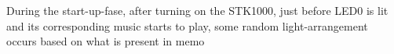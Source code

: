 \documentclass[a4paper,12pt]{article}
\begin{document}
During the start-up-fase, after turning on the STK1000, just before LED0 is lit and its corresponding music starts to play, some random light-arrangement occurs based on what is present in memo                                                                                                                                                                                                                                                                                                                                                                                                                                                                                                                                                                                                                                                                                                                                                                                                                                                                                                                                                                                                                                                                                                                                                                                                                                                                                                                                                                                                                                                                                                                                                                                                                                                                                                                                                                                                                                                                                                                                                                                                                                                                                                                                                                                                                                                                                                                                                                                                                                                                                                                                                                                                                                                                                                                                                                                                                                                                                                                                                                                                                                                                                                                                                                                                                                                                       
\end{document}
